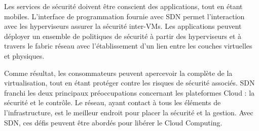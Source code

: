 Les services de sécurité doivent être conscient des applications, tout en étant mobiles. L'interface de programmation fournie avec SDN permet l'interaction avec les hyperviseurs assurer la sécurité inter-VMs. Les applications peuvent déployer un ensemble de politiques de sécurité à partir des hyperviseurs et à travers le \gls{fabric} réseau avec l'établissement d'un lien entre les couches virtuelles et physiques. 

Comme résultat, les consommateurs peuvent apercevoir la complète de la virtualisation, tout en étant protéger contre les risques de sécurité associés. SDN franchi les deux principaux préoccupations concernant les plateformes Cloud : la sécurité et le contrôle. Le réseau, ayant contact à tous les éléments de l'infrastructure, est le meilleur endroit pour placer la sécurité et la gestion. Avec SDN, ces défis peuvent être abordés pour libérer le Cloud Computing. 

